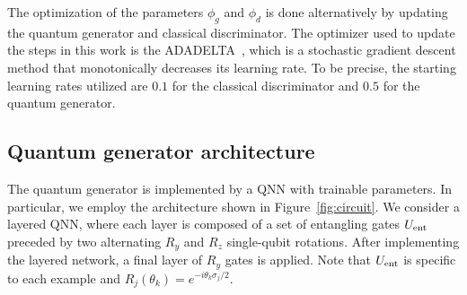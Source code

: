 \documentclass[twocolumn,preprintnumbers,superscriptaddress]{revtex4-2}
\newcommand{\commentCBP}[1]{{\color{red} {[C: #1]}}}
\newcommand{\commentMC}[1]{{\color{magenta} {[M: #1]}}}
\newcommand{\commentAF}[1]{{\color{cyan} {[A: #1]}}}
\newcommand{\commentDMG}[1]{{\color{orange} {[D: #1]}}}
\begin{document}
The optimization of the parameters $\phi_g$ and $\phi_d$ is done alternatively by updating the quantum generator and classical discriminator. The optimizer used to update the steps in this work is the ADADELTA~\cite{zeiler2012adadelta}, which is a stochastic gradient descent method that monotonically decreases its learning rate. To be precise, the starting learning rates utilized are $0.1$ for the classical discriminator and $0.5$ for the quantum generator.

\subsection{Quantum generator architecture}
The quantum generator is implemented by a QNN with trainable parameters. In particular, we employ the architecture shown in Figure~\ref{fig:circuit}. We consider a layered QNN, where each layer is composed of a set of entangling gates $U_{\rm ent}$ preceded by two alternating $R_y$ and $R_z$ single-qubit rotations. After implementing the layered network, a final layer of $R_y$ gates is applied. Note that $U_{\rm ent}$ is specific to each example and $R_j(\theta_k) = e^{-i\theta_k \sigma_j /2}$. 
\end{document}

